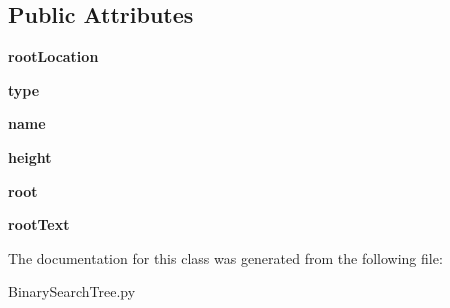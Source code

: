 \subsection*{Public Attributes}
\begin{DoxyCompactItemize}
\item 
\mbox{\label{class_binary_search_tree_1_1_binary_search_tree_a399ad4c8ba4b21962841a0895f4933a5}} 
{\bfseries root\+Location}
\item 
\mbox{\label{class_binary_search_tree_1_1_binary_search_tree_a28336f9c105f55dd0242225f94491a08}} 
{\bfseries type}
\item 
\mbox{\label{class_binary_search_tree_1_1_binary_search_tree_a507e958f649521d8d853007eefe3149b}} 
{\bfseries name}
\item 
\mbox{\label{class_binary_search_tree_1_1_binary_search_tree_a8bb002fc1b00983a2512240378a5ccc2}} 
{\bfseries height}
\item 
\mbox{\label{class_binary_search_tree_1_1_binary_search_tree_a4aa0ee481a5c399dc220c4c2284c7884}} 
{\bfseries root}
\item 
\mbox{\label{class_binary_search_tree_1_1_binary_search_tree_af6103954606e866294ab429e5b24aa01}} 
{\bfseries root\+Text}
\end{DoxyCompactItemize}


The documentation for this class was generated from the following file\+:\begin{DoxyCompactItemize}
\item 
Binary\+Search\+Tree.\+py\end{DoxyCompactItemize}
